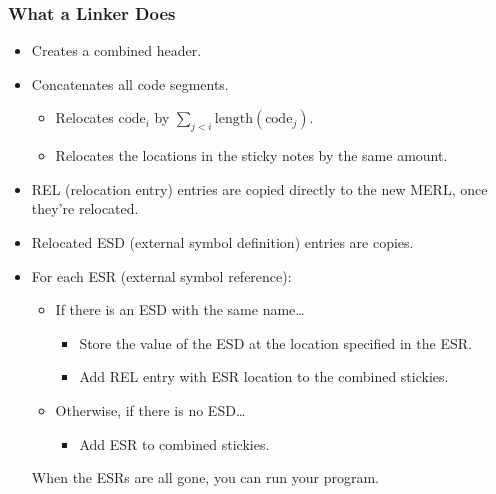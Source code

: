 \documentclass[]{article}
\theoremstyle{definition}
\begin{document}
			\subsubsection{What a Linker Does}
				\begin{itemize}
					\item Creates a combined header.
					\item Concatenates all code segments.
						\begin{itemize}
							\item Relocates $\text{code}_i$ by $\displaystyle \sum_{j < i} \text{length}(\text{code}_j)$.
							\item Relocates the locations in the sticky notes by the same amount.
						\end{itemize}
					\item REL (relocation entry) entries are copied directly to the new MERL, once they're relocated.
					\item Relocated ESD (external symbol definition) entries are copies.
					\item For each ESR (external symbol reference):
						\begin{itemize}
							\item If there is an ESD with the same name\dots
								\begin{itemize}
									\item Store the value of the ESD at the location specified in the ESR.
									\item Add REL entry with ESR location to the combined stickies.
								\end{itemize}
							\item Otherwise, if there is no ESD\dots
								\begin{itemize}
									\item Add ESR to combined stickies.
								\end{itemize}
						\end{itemize}

						When the ESRs are all gone, you can run your program.
				\end{itemize}
\end{document}

